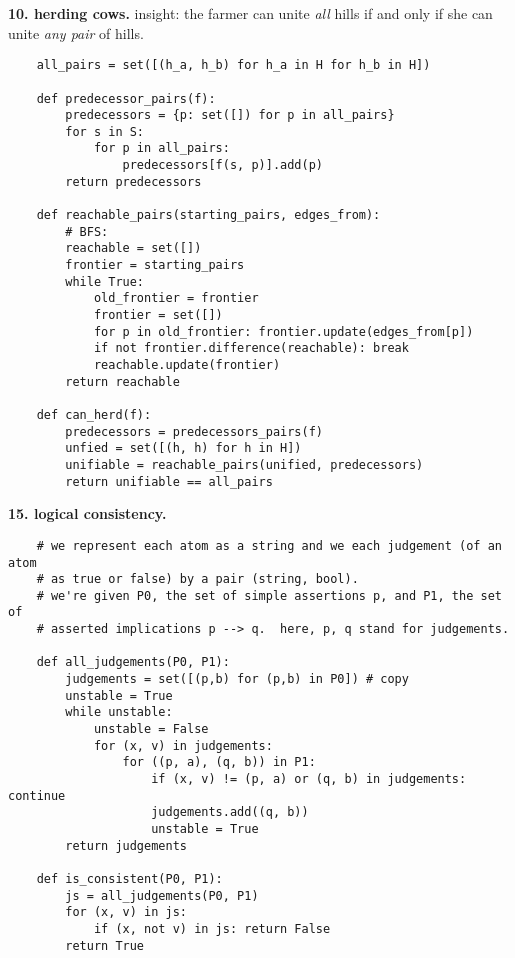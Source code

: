 \documentclass{article}
\begin{document}
\newpage
    \par\noindent\hspace{-1cm}
    \textbf{10. herding cows.}
        insight: the farmer can unite \emph{all} hills if and only if
                 she can unite \emph{any pair} of hills.
\begin{verbatim}
    all_pairs = set([(h_a, h_b) for h_a in H for h_b in H])

    def predecessor_pairs(f):
        predecessors = {p: set([]) for p in all_pairs}
        for s in S:
            for p in all_pairs:
                predecessors[f(s, p)].add(p)
        return predecessors

    def reachable_pairs(starting_pairs, edges_from):
        # BFS: 
        reachable = set([])
        frontier = starting_pairs
        while True:
            old_frontier = frontier
            frontier = set([])
            for p in old_frontier: frontier.update(edges_from[p]) 
            if not frontier.difference(reachable): break
            reachable.update(frontier)
        return reachable

    def can_herd(f): 
        predecessors = predecessors_pairs(f)
        unfied = set([(h, h) for h in H])
        unifiable = reachable_pairs(unified, predecessors) 
        return unifiable == all_pairs

\end{verbatim}

    \par\noindent\hspace{-1cm}
    \textbf{15. logical consistency.}

\begin{verbatim}
    # we represent each atom as a string and we each judgement (of an atom
    # as true or false) by a pair (string, bool).
    # we're given P0, the set of simple assertions p, and P1, the set of
    # asserted implications p --> q.  here, p, q stand for judgements.

    def all_judgements(P0, P1): 
        judgements = set([(p,b) for (p,b) in P0]) # copy
        unstable = True
        while unstable:
            unstable = False
            for (x, v) in judgements:
                for ((p, a), (q, b)) in P1:
                    if (x, v) != (p, a) or (q, b) in judgements: continue
                    judgements.add((q, b))
                    unstable = True
        return judgements

    def is_consistent(P0, P1):
        js = all_judgements(P0, P1)
        for (x, v) in js:
            if (x, not v) in js: return False
        return True
\end{verbatim}
\end{document}
